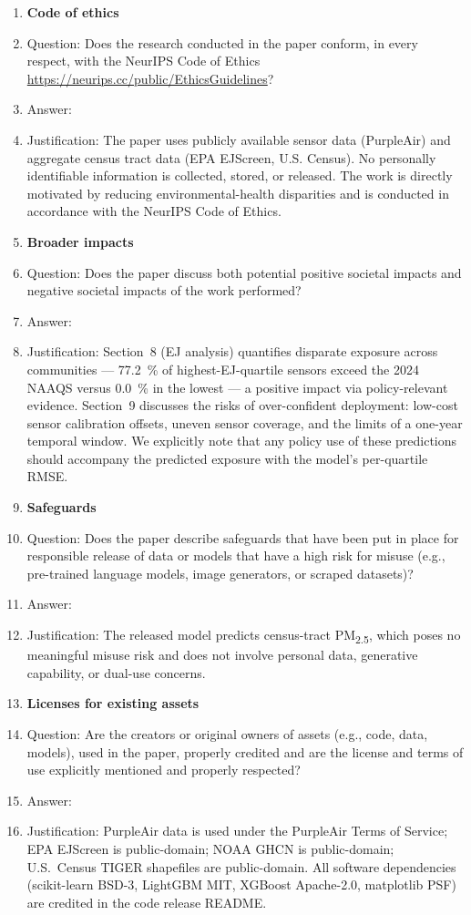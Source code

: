 \begin{enumerate}
\item {\bf Code of ethics}
    \item[] Question: Does the research conducted in the paper conform, in every respect, with the NeurIPS Code of Ethics \url{https://neurips.cc/public/EthicsGuidelines}?
    \item[] Answer: \answerYes{}
    \item[] Justification: The paper uses publicly available sensor data (PurpleAir) and aggregate census tract data (EPA EJScreen, U.S. Census). No personally identifiable information is collected, stored, or released. The work is directly motivated by reducing environmental-health disparities and is conducted in accordance with the NeurIPS Code of Ethics.

\item {\bf Broader impacts}
    \item[] Question: Does the paper discuss both potential positive societal impacts and negative societal impacts of the work performed?
    \item[] Answer: \answerYes{}
    \item[] Justification: Section~8 (EJ analysis) quantifies disparate exposure across communities --- \SI{77.2}{\percent} of highest-EJ-quartile sensors exceed the 2024 NAAQS versus \SI{0.0}{\percent} in the lowest --- a positive impact via policy-relevant evidence. Section~9 discusses the risks of over-confident deployment: low-cost sensor calibration offsets, uneven sensor coverage, and the limits of a one-year temporal window. We explicitly note that any policy use of these predictions should accompany the predicted exposure with the model's per-quartile RMSE.

\item {\bf Safeguards}
    \item[] Question: Does the paper describe safeguards that have been put in place for responsible release of data or models that have a high risk for misuse (e.g., pre-trained language models, image generators, or scraped datasets)?
    \item[] Answer: \answerNA{}
    \item[] Justification: The released model predicts census-tract PM\textsubscript{2.5}, which poses no meaningful misuse risk and does not involve personal data, generative capability, or dual-use concerns.

\item {\bf Licenses for existing assets}
    \item[] Question: Are the creators or original owners of assets (e.g., code, data, models), used in the paper, properly credited and are the license and terms of use explicitly mentioned and properly respected?
    \item[] Answer: \answerYes{}
    \item[] Justification: PurpleAir data is used under the PurpleAir Terms of Service; EPA EJScreen is public-domain; NOAA GHCN is public-domain; U.S.\ Census TIGER shapefiles are public-domain. All software dependencies (scikit-learn BSD-3, LightGBM MIT, XGBoost Apache-2.0, matplotlib PSF) are credited in the code release README.


\end{enumerate}
